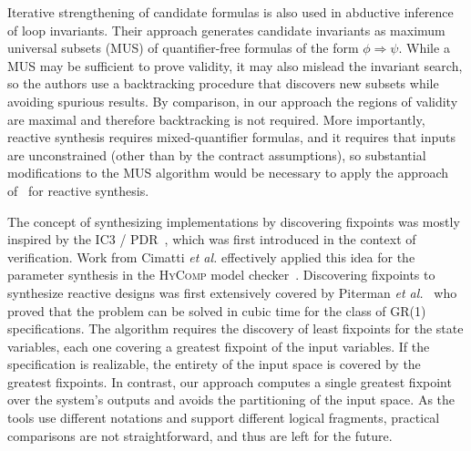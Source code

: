 Iterative strengthening of candidate formulas is also used in abductive inference~\cite{dillig2013inductive}
of loop invariants.
Their approach generates candidate invariants as maximum universal subsets (MUS) of quantifier-free formulas of the form $\phi \Rightarrow \psi$.
While a MUS may be sufficient to prove validity, it may also mislead the invariant search, so the authors use a backtracking procedure that discovers new subsets while avoiding spurious results. By comparison, in our approach the regions of validity are maximal and therefore backtracking is not required.  More importantly, reactive synthesis requires mixed-quantifier formulas, and it requires that inputs are unconstrained (other than by the contract assumptions), so substantial modifications to the MUS algorithm would be necessary to apply the approach of~\cite{dillig2013inductive} for reactive synthesis.  %

The concept of synthesizing implementations by discovering fixpoints was mostly
inspired by the IC3 / PDR~\cite{bradley2011sat,een2011efficient}, which was first introduced
in the context of verification. Work from Cimatti \textit{et al.} effectively
applied this idea for the parameter synthesis in the
\textsc{HyComp} model checker~\cite{DBLP:conf/fmcad/CimattiGMT13, cimatti2015hycomp}.
Discovering fixpoints to synthesize reactive designs was first
extensively covered by Piterman \textit{et al.}~\cite{piterman2006synthesis}
who proved that the problem can be solved in cubic time for the class of GR(1) specifications.
The algorithm requires the discovery of least fixpoints for the state variables,
each one covering a greatest fixpoint of the input variables. If the specification
is realizable, the entirety of the input space is covered by the greatest fixpoints. 
In contrast, our approach computes a single greatest fixpoint over the system's outputs and avoids the partitioning of the input space.  As the tools use different notations and support different logical fragments, practical comparisons are not straightforward, and thus are left for the future.

